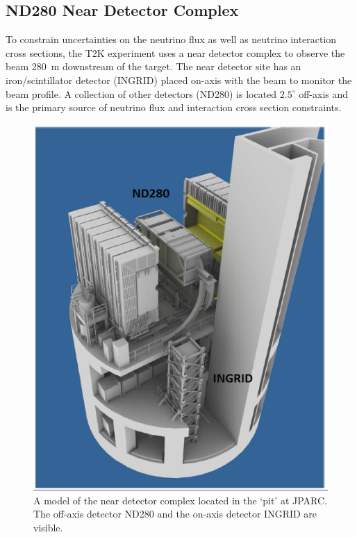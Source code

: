 \subsection{ND280 Near Detector Complex}

To constrain uncertainties on the neutrino flux as well as neutrino
interaction cross sections, the T2K experiment uses a near detector
complex to observe the beam 280~m downstream of the target. The near detector
site has an iron/scintillator detector (INGRID) placed on-axis with the beam to
monitor the beam profile. A collection of other detectors (ND280) is located
$2.5^{\circ}$ off-axis and is the primary source of neutrino flux and
interaction cross section constraints. 

\begin{figure}
\begin{center}
\includegraphics[width=6in]{./Figures/pit.png}
\end{center}
\caption{A model of the near detector complex located in the `pit' at
  JPARC. The off-axis detector ND280 and the on-axis detector INGRID
  are visible.}
\label{fig:pit}
\end{figure}


